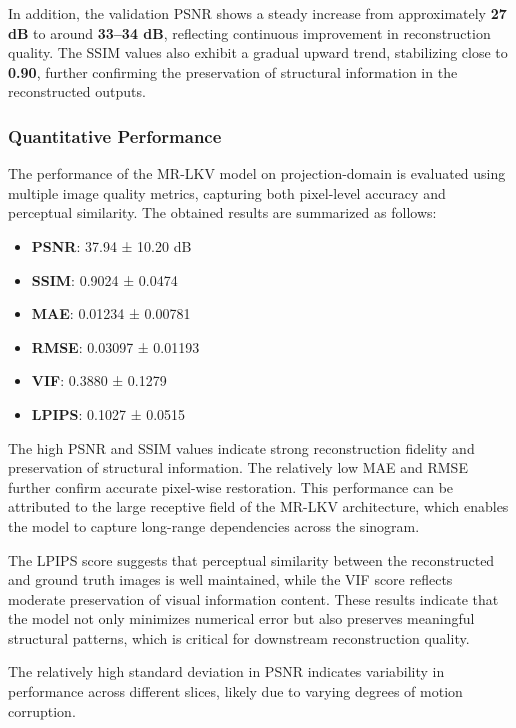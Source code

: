 In addition, the validation PSNR shows a steady increase from approximately \textbf{27 dB} to around \textbf{33–34 dB}, reflecting continuous improvement in reconstruction quality. The SSIM values also exhibit a gradual upward trend, stabilizing close to \textbf{0.90}, further confirming the preservation of structural information in the reconstructed outputs.

 




\subsubsection{Quantitative Performance}

The performance of the MR-LKV model on projection-domain is evaluated using multiple image quality metrics, capturing both pixel-level accuracy and perceptual similarity. The obtained results are summarized as follows:

\begin{itemize}
    \item \textbf{PSNR}: 37.94 ± 10.20 dB
    \item \textbf{SSIM}: 0.9024 ± 0.0474
    \item \textbf{MAE}: 0.01234 ± 0.00781
    \item \textbf{RMSE}: 0.03097 ± 0.01193
    \item \textbf{VIF}: 0.3880 ± 0.1279
    \item \textbf{LPIPS}: 0.1027 ± 0.0515
\end{itemize}

The high PSNR and SSIM values indicate strong reconstruction fidelity and preservation of structural information. The relatively low MAE and RMSE further confirm accurate pixel-wise restoration. This performance can be attributed to the large receptive field of the MR-LKV architecture, which enables the model to capture long-range dependencies across the sinogram.  

The LPIPS score suggests that perceptual similarity between the reconstructed and ground truth images is well maintained, while the VIF score reflects moderate preservation of visual information content. These results indicate that the model not only minimizes numerical error but also preserves meaningful structural patterns, which is critical for downstream reconstruction quality.  

The relatively high standard deviation in PSNR indicates variability in performance across different slices, likely due to varying degrees of motion corruption.


